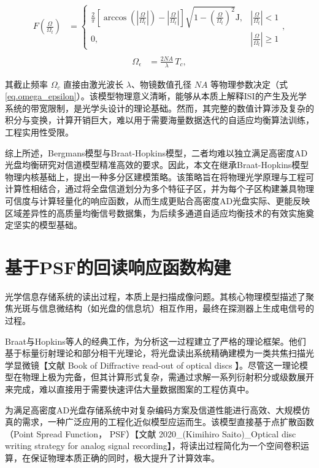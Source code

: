 \begin{align}
	F\left( \frac{\Omega}{\Omega_t} \right) &= 
	\begin{cases} 
		\frac{2}{\pi} \left[ \arccos \left( \left| \frac{\Omega}{\Omega_t} \right| \right) 
		- \left| \frac{\Omega}{\Omega_t} \right| \right] \sqrt{1 - \left( \frac{\Omega}{\Omega_t} \right)^2 } \text{J}, 
		& \left| \frac{\Omega}{\Omega_t} \right| < 1 \\[8pt]
		0, 
		& \left| \frac{\Omega}{\Omega_t} \right| \geq 1 
	\end{cases}, \label{eq.frequency} \\
\end{align}
\begin{align}
\Omega_{\epsilon} &= \frac{2NA}{\lambda}\, T_c, \label{eq.omega_epsilon} 
\end{align}

其截止频率 \( \Omega_c \) 直接由激光波长 \( \lambda \)、物镜数值孔径 \( NA \) 等物理参数决定（式\ref{eq.omega_epsilon}）。该模型物理意义清晰，能够从本质上解释ISI的产生及光学系统的带宽限制，是光学头设计的理论基础。然而，其完整的数值计算涉及复杂的积分与变换，计算开销巨大，难以用于需要海量数据迭代的自适应均衡算法训练，工程实用性受限。

综上所述，Bergmans模型与Braat-Hopkins模型，二者均难以独立满足高密度AD光盘均衡研究对信道模型精准高效的要求。因此，本文在继承Braat-Hopkins模型物理内核基础上，提出一种多分区建模策略。该策略旨在将物理光学原理与工程可计算性相结合，通过将全盘信道划分为多个特征子区，并为每个子区构建兼具物理可信度与计算轻量化的响应函数，从而生成更贴合高密度AD光盘实际、更能反映区域差异性的高质量均衡信号数据集，为后续多通道自适应均衡技术的有效实施奠定坚实的模型基础。

\section{基于PSF的回读响应函数构建}
光学信息存储系统的读出过程，本质上是扫描成像问题。其核心物理模型描述了聚焦光斑与信息微结构（如光盘的信息坑）相互作用，最终在探测器上生成电信号的过程。

Braat与Hopkins等人的经典工作，为分析这一过程建立了严格的理论框架。他们基于标量衍射理论和部分相干光理论，将光盘读出系统精确建模为一类共焦扫描光学显微镜【文献 Book of Diffractive read-out of optical discs 】。尽管这一理论模型在物理上极为完备，但其计算形式复杂，需通过求解一系列衍射积分或级数展开来完成，难以直接用于需要快速评估大量数据图案的工程仿真中。

为满足高密度AD光盘存储系统中对复杂编码方案及信道性能进行高效、大规模仿真的需求，一种广泛应用的工程化近似模型应运而生。该模型直接基于点扩散函数（Point Spread Function， PSF）【文献 2020_(Kimihiro Saito)_Optical disc writing strategy for analog signal recording】，将读出过程简化为一个空间卷积运算，在保证物理本质正确的同时，极大提升了计算效率。

